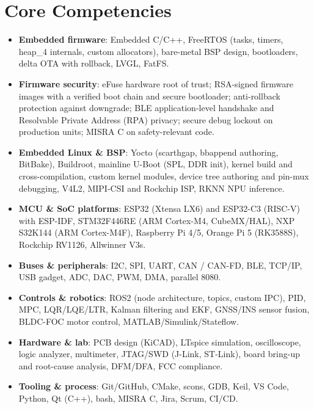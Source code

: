 \documentclass[11pt,a4paper,sans]{moderncv}
\begin{document}
\section{Core Competencies}
\vspace{1pt}
\begin{itemize}

\item \textbf{Embedded firmware}: Embedded C/C++, FreeRTOS (tasks, timers, heap\_4 internals, custom allocators), bare-metal BSP design, bootloaders, delta OTA with rollback, LVGL, FatFS.

\item \textbf{Firmware security}: eFuse hardware root of trust; RSA-signed firmware images with a verified boot chain and secure bootloader; anti-rollback protection against downgrade; BLE application-level handshake and Resolvable Private Address (RPA) privacy; secure debug lockout on production units; MISRA C on safety-relevant code.

\item \textbf{Embedded Linux \& BSP}: Yocto (scarthgap, bbappend authoring, BitBake), Buildroot, mainline U-Boot (SPL, DDR init), kernel build and cross-compilation, custom kernel modules, device tree authoring and pin-mux debugging, V4L2, MIPI-CSI and Rockchip ISP, RKNN NPU inference.

\item \textbf{MCU \& SoC platforms}: ESP32 (Xtensa LX6) and ESP32-C3 (RISC-V) with ESP-IDF, STM32F446RE (ARM Cortex-M4, CubeMX/HAL), NXP S32K144 (ARM Cortex-M4F), Raspberry Pi 4/5, Orange Pi 5 (RK3588S), Rockchip RV1126, Allwinner V3s.

\item \textbf{Buses \& peripherals}: I2C, SPI, UART, CAN / CAN-FD, BLE, TCP/IP, USB gadget, ADC, DAC, PWM, DMA, parallel 8080.

\item \textbf{Controls \& robotics}: ROS2 (node architecture, topics, custom IPC), PID, MPC, LQR/LQE/LTR, Kalman filtering and EKF, GNSS/INS sensor fusion, BLDC-FOC motor control, MATLAB/Simulink/Stateflow.

\item \textbf{Hardware \& lab}: PCB design (KiCAD), LTspice simulation, oscilloscope, logic analyzer, multimeter, JTAG/SWD (J-Link, ST-Link), board bring-up and root-cause analysis, DFM/DFA, FCC compliance.

\item \textbf{Tooling \& process}: Git/GitHub, CMake, scons, GDB, Keil, VS Code, Python, Qt (C++), bash, MISRA C, Jira, Scrum, CI/CD.

\end{itemize}
\end{document}
